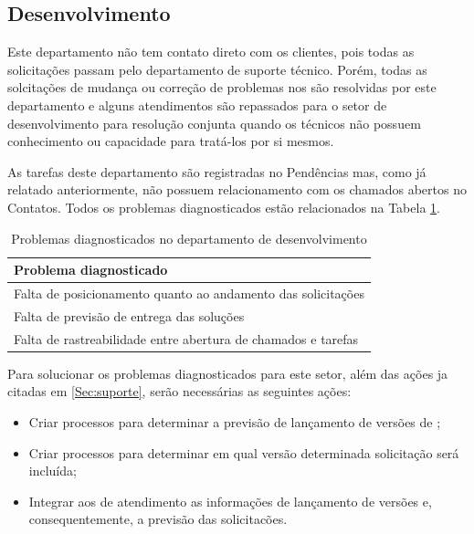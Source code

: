 \subsection{Desenvolvimento}
\label{Sec:desenvolvimento}

Este departamento não tem contato direto com os clientes, pois todas as solicitações passam pelo departamento de suporte técnico. Porém, todas as solcitações de mudança ou correção de problemas nos \sws são resolvidas por este departamento e alguns atendimentos são repassados para o setor de desenvolvimento para resolução conjunta quando os técnicos não possuem conhecimento ou capacidade para tratá-los por si mesmos. 

As tarefas deste departamento são registradas no \sw Pendências mas, como já relatado anteriormente, não possuem relacionamento com os chamados abertos no \sw Contatos. Todos os problemas diagnosticados estão relacionados na Tabela \ref{Tab:probl:desenv}.

\begin{table}[h!]\footnotesize
\centering
\begin{tabular}
{
 	|p{14cm}|
}

	\hline
	\textbf{Problema diagnosticado}\\
	\hline

	Falta de posicionamento quanto ao andamento das solicitações\\
	\hline

	Falta de previsão de entrega das soluções\\
	\hline

	Falta de rastreabilidade entre abertura de chamados e tarefas\\
	\hline

\end{tabular}
\caption {Problemas diagnosticados no departamento de desenvolvimento}
\label{Tab:probl:desenv}
\end{table}

Para solucionar os problemas diagnosticados para este setor, além das ações ja citadas em \ref{Sec:suporte}, serão necessárias as seguintes ações:

\begin{itemize}

\item Criar processos para determinar a previsão de lançamento de versões de \sws;

\item Criar processos para determinar em qual versão determinada solicitação será incluída;

\item Integrar aos \sws de atendimento as informações de lançamento de versões e, consequentemente, a previsão das solicitacões.

\end{itemize}

